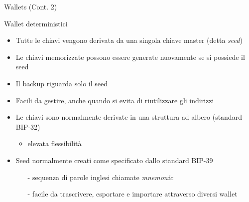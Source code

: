 \documentclass{beamer}
\begin{document}
  \begin{frame}{Wallets (Cont. 2)}
    \begin{block}{Wallet deterministici}
      \begin{itemize}
        \item Tutte le chiavi vengono derivata da una singola chiave master (detta \emph{seed}) 
        \item Le chiavi memorizzate possono essere generate nuovamente se si possiede il seed
        \item Il backup riguarda solo il seed
        \item Facili da gestire, anche quando si evita di riutilizzare gli indirizzi
        \item Le chiavi sono normalmente derivate in una struttura ad albero (standard BIP-32) 
        \begin{itemize}
            \item elevata flessibilità
        \end{itemize}
        \item Seed normalmente creati come specificato dallo standard BIP-39 
        \begin{itemize}
          \item[-] sequenza di parole inglesi chiamate \emph{mnemonic} 
          \item[-] facile da trascrivere, esportare e importare attraverso diversi wallet
        \end{itemize}
      \end{itemize}
    \end{block}
  \end{frame}
\end{document}

